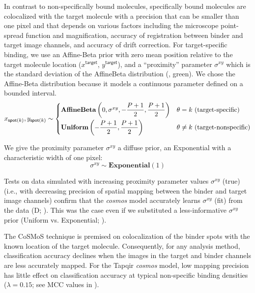 In contrast to non-specifically bound molecules, specifically bound molecules are colocalized with the target molecule with a precision that can be smaller than one pixel and that depends on various factors including the microscope point-spread function and magnification, accuracy of registration between binder and target image channels, and accuracy of drift correction. For target-specific binding, we use an Affine-Beta prior with zero mean position relative to the target molecule location ($x^\mathsf{target}$, $y^\mathsf{target}$), and a ``proximity'' parameter $\sigma^{xy}$ which is the  standard deviation of the AffineBeta distribution (, green). We chose the Affine-Beta distribution because it models a continuous parameter defined on a bounded interval.
%
\begin{equation}
    x_{\mathsf{spot}(k)}, y_{\mathsf{spot}(k)} \sim
    \begin{cases}
        \mathbf{AffineBeta}\left( 0, \sigma^{xy}, -\dfrac{P+1}{2}, \dfrac{P+1}{2} \right) & \theta = k ~\text{(target-specific)} \\
        \mathbf{Uniform}\left(-\dfrac{P+1}{2}, \dfrac{P+1}{2} \right) & \theta \neq k ~\text{(target-nonspecific)} \rule{0pt}{4ex}
    \end{cases}
\end{equation}

We give the proximity parameter $\sigma^{xy}$ a diffuse prior, an Exponential with a characteristic width of one pixel:
%
\begin{equation}
    \sigma^{xy} \sim \mathbf{Exponential}(1)
\end{equation}

Tests on data simulated with increasing proximity parameter values $\sigma^{xy}$ (true) (i.e., with decreasing precision of spatial mapping between the binder and target image channels) confirm that the \emph{cosmos} model accurately learns  $\sigma^{xy}$ (fit) from the data  (D; ).  This was the case even if we substituted a less-informative $\sigma^{xy}$ prior (Uniform vs. Exponential; ).

The CoSMoS technique is premised on colocalization of the binder spots with the known location of the target molecule.  Consequently, for any analysis method, classification accuracy declines when the images in the target and binder channels are less accurately mapped.  For the Tapqir \emph{cosmos} model, low mapping precision has little effect on classification accuracy at typical non-specific binding densities ($\lambda = 0.15$; see MCC values in ).

